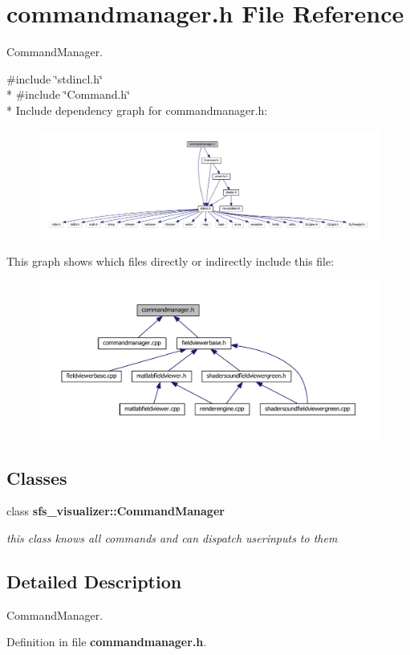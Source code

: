 \section{commandmanager.\-h File Reference}
\label{commandmanager_8h}


Command\-Manager.  


{\ttfamily \#include \char`\"{}stdincl.\-h\char`\"{}}\\*
{\ttfamily \#include \char`\"{}Command.\-h\char`\"{}}\\*
Include dependency graph for commandmanager.\-h\-:\nopagebreak
\begin{figure}[H]
\begin{center}
\leavevmode
\includegraphics[width=350pt]{df/dc5/commandmanager_8h__incl}
\end{center}
\end{figure}
This graph shows which files directly or indirectly include this file\-:\nopagebreak
\begin{figure}[H]
\begin{center}
\leavevmode
\includegraphics[width=350pt]{d8/ddd/commandmanager_8h__dep__incl}
\end{center}
\end{figure}
\subsection*{Classes}
\begin{DoxyCompactItemize}
\item 
class {\bf sfs\-\_\-visualizer\-::\-Command\-Manager}
\begin{DoxyCompactList}\small\item\em this class knows all commands and can dispatch userinputs to them \end{DoxyCompactList}\end{DoxyCompactItemize}


\subsection{Detailed Description}
Command\-Manager. 

Definition in file {\bf commandmanager.\-h}.

